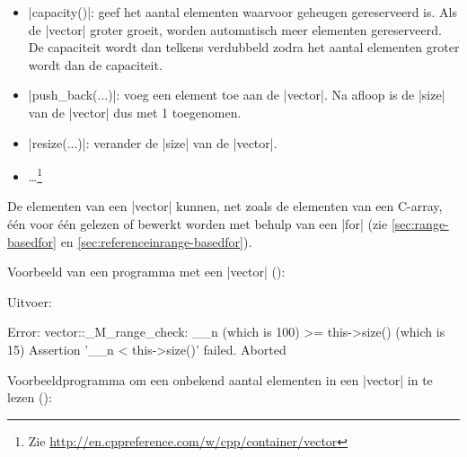 \begin{cpplstShortInline}
\begin{itemize}
\begin{itemize}
        \footnote{%
            Een  is een manier om een fout vanuit een component door te geven aan de code die deze component gebruikt.
             worden in \cref{exceptions} behandeld.
        } als dit niet zo is.
        \item |capacity()|: geef het aantal elementen waarvoor geheugen gereserveerd is.
        Als de |vector| groter groeit, worden automatisch meer elementen gereserveerd.
        De capaciteit wordt dan telkens verdubbeld zodra het aantal elementen groter wordt dan de capaciteit.
        \item |push_back(...)|: voeg een element toe aan de |vector|.
        Na afloop is de |size| van de |vector| dus met 1 toegenomen.
        \item |resize(...)|: verander de |size| van de |vector|.
        \item \ldots\footnote{Zie \url{http://en.cppreference.com/w/cpp/container/vector}}
    \end{itemize}
\end{itemize}

De elementen van een |vector| kunnen, net zoals de elementen van een C\hyp{}array, één voor één gelezen of bewerkt worden met behulp van een  |for| (zie \cref{sec:range-basedfor} en \cref{sec:referenceinrange-basedfor}).

Voorbeeld van een programma met een |vector| ():

Uitvoer:
\begin{cpplstfragment}[language=]
[0, 1, 4, 9, 16, 25, 36, 49, 64, 81, 100, 121, 144, 169, 196]
[0, 1, 4, 9, 16, 25, 36, 49, 64, 81, 100, 121, 144, 169, 196]
Error: vector::_M_range_check: __n (which is 100) >= this->size() (which is 15)
Assertion '__n < this->size()' failed.
Aborted
\end{cpplstfragment}


Voorbeeldprogramma om een onbekend aantal elementen in een |vector| in te lezen ():


\end{cpplstShortInline}
